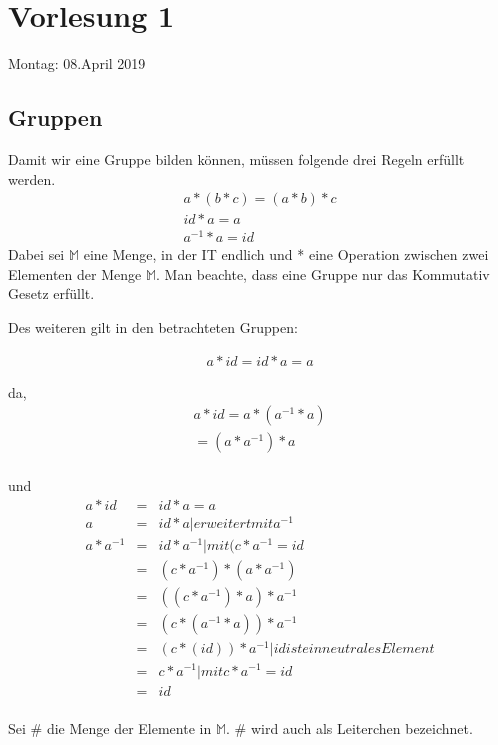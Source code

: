 \section{Vorlesung 1}
\label{sec:Vorlesung1}
Montag: 08.April 2019

\subsection{Gruppen} 
\label{sec:gruppen}

Damit wir eine Gruppe bilden können, müssen folgende drei Regeln erfüllt werden.
\begin{eqnarray}
a * (b * c) = (a * b) * c  \\
id * a = a \\
a^{-1} * a = id
\end{eqnarray}
Dabei sei $\mathbb{M}$ eine Menge, in der IT endlich und *  eine Operation zwischen zwei Elementen der Menge $\mathbb{M}$. Man beachte, dass eine Gruppe nur das Kommutativ Gesetz erfüllt.

Des weiteren gilt in den betrachteten Gruppen:

\begin{eqnarray}
a * id  = id * a = a
\end{eqnarray}

da,
\begin{eqnarray}
a * id = a * (a^{-1} * a) \\
 =(a * a^{-1}) * a \\
\end{eqnarray}

und
\begin{eqnarray}
a * id &=& id * a = a\\
a &=& id * a | erweitert mit a^{-1} \\
a * a^{-1} &=& id * a^{-1} | mit (c * a^{-1} = id\\
&=&(c * a^{-1}) * (a * a^{-1}) \\
&=&((c * a^{-1}) * a) * a^{-1} \\
&=&( c * (a^{-1} * a)) * a^{-1} \\
&=&( c * (id)) * a^{-1} | id ist ein neutrales Element\\
&=&c * a^{-1} | mit c * a^{-1} = id \\
&=&id \\
\end{eqnarray}

Sei $\#$ die Menge der Elemente in $\mathbb{M}$. $\#$ wird auch als Leiterchen bezeichnet.

